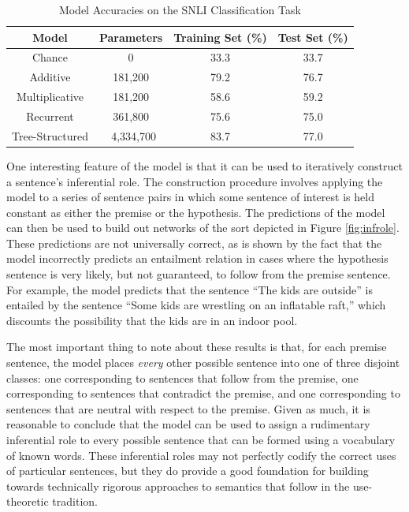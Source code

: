 \begin{table}[!t]
\begin{center} 
\caption{Model Accuracies on the SNLI Classification Task} 
\label{accuracy} 
\vskip 0.12in
\begin{tabular}{c c c c} 
\hline
Model & Parameters &  Training Set (\%)  & Test Set (\%)\\
\hline
Chance  & 0 & 33.3 &  33.7 \\
Additive & 181,200 & 79.2 & 76.7 \\ 
Multiplicative & 181,200 & 58.6 & 59.2 \\
Recurrent & 361,800 &  75.6 & 75.0  \\
Tree-Structured &  4,334,700 &  83.7 & 77.0  \\
\hline
\end{tabular} 
\end{center} 
\end{table}

One interesting feature of the model is that it can be used to iteratively construct a sentence's inferential role. The construction procedure involves applying the model to a series of sentence pairs in which some sentence of interest is held constant as either the premise or the hypothesis. The predictions of the model can then be used to build out networks of the sort depicted in Figure \ref{fig:infrole}. These predictions are not universally correct, as is shown by the fact that the model incorrectly predicts an entailment relation in cases where the hypothesis sentence is very likely, but not guaranteed, to follow from the premise sentence. For example, the model predicts that the sentence ``The kids are outside'' is entailed by the sentence ``Some kids are wrestling on an inflatable raft,'' which discounts the possibility that the kids are in an indoor pool.

The most important thing to note about these results is that, for each premise sentence, the model places \textit{every} other possible sentence into one of three disjoint classes: one corresponding to sentences that follow from the premise, one corresponding to sentences that contradict the premise, and one corresponding to sentences that are neutral with respect to the premise. Given as much, it is reasonable to conclude that the model can be used to assign a rudimentary inferential role to every possible sentence that can be formed using a vocabulary of known words. These inferential roles may not perfectly codify the correct uses of particular sentences, but they do provide a good foundation for building towards technically rigorous approaches to semantics that follow in the use-theoretic tradition.  

